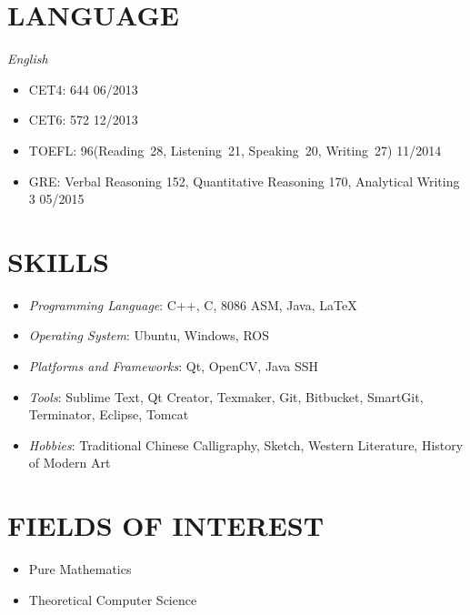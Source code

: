 \documentclass[margin, 10pt]{res} %
\begin{document}
\begin{resume}
\section{LANGUAGE}
{\sl English}
\begin{itemize}
\item CET4: 644 \hfill 06/2013 
\item CET6: 572 \hfill 12/2013 
\item TOEFL: 96(Reading\ 28, Listening\ 21, Speaking\ 20, Writing\ 27) \hfill 11/2014 
\item GRE: Verbal Reasoning 152, Quantitative Reasoning 170, Analytical Writing 3 \hfill 05/2015 
\end{itemize}

\section{SKILLS}
\begin{itemize}
\item {\sl Programming Language}: C++, C, 8086 ASM, Java, \LaTeX
\item {\sl Operating System}: Ubuntu, Windows, ROS
\item {\sl Platforms and Frameworks}: Qt, OpenCV, Java SSH
\item {\sl Tools}: Sublime Text, Qt Creator, Texmaker, Git, Bitbucket, SmartGit, Terminator, Eclipse, Tomcat
\item {\sl Hobbies}: Traditional Chinese Calligraphy, Sketch, Western Literature, History of Modern Art
\end{itemize}

\section{FIELDS OF INTEREST}
\begin{itemize}
\item Pure Mathematics
\item Theoretical Computer Science
\end{itemize}

\end{resume}
\end{document}
